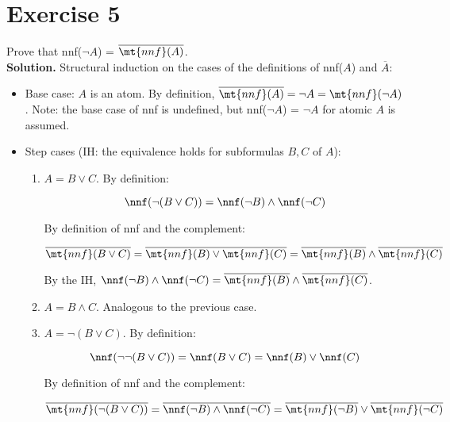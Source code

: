 \section{Exercise 5}

Prove that nnf($\neg A$) = $\overline{\mt{nnf}(A)}$.\\

\noindent
\textbf{Solution.} Structural induction on the cases of the definitions of nnf($A$) and $\overline{A}$:

\begin{itemize}
	\item Base case: $A$ is an atom. By definition, $\overline{\mt{nnf} (A)} = \neg A = \mt{nnf}(\neg A)$. Note: the base case of nnf is undefined, but nnf($\neg A$) = $\neg A$ for atomic $A$ is assumed.
	
	\item Step cases (IH: the equivalence holds for subformulas $B,C$ of $A$):
		\begin{enumerate}
			\item $A = B \vee C$. By definition: 
			
			\begin{equation}
				\nnf(\neg (B \vee C)) = \nnf(\neg B) \wedge \nnf(\neg C)
			\end{equation}
			
			By definition of nnf and the complement:
			
			\begin{equation}
				\overline{\mt{nnf}(B \vee C)} = \overline{\mt{nnf}(B) \vee \mt{nnf}(C)} = \overline{\mt{nnf}(B)} \wedge \overline{\mt{nnf}(C)} 
			\end{equation}
			
			By the IH, $\nnf(\neg B) \wedge \nnf(\neg C) = \overline{\mt{nnf}(B)} \wedge \overline{\mt{nnf}(C)}$.
			
			\item $A = B \wedge C$. Analogous to the previous case.
			
			\item $A = \neg (B \vee C)$. By definition: 
						
			\begin{equation}
				\nnf(\neg \neg (B \vee C)) = \nnf(B \vee C) = \nnf(B) \vee \nnf(C)
			\end{equation}
			
			By definition of nnf and the complement:
			
			\begin{equation}
				\overline{\mt{nnf}(\neg (B \vee C))} = \overline{\nnf(\neg B) \wedge \nnf(\neg C)} = \overline{\mt{nnf}(\neg B)} \vee \overline{\mt{nnf}(\neg C)} 
			\end{equation}
			

\end{enumerate}
\end{itemize}
